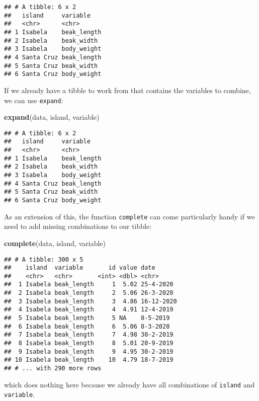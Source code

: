 \documentclass[
]{book}
\newenvironment{Shaded}{}{}
\newcommand{\KeywordTok}[1]{\textcolor[rgb]{0.00,0.44,0.13}{\textbf{#1}}}
\newcommand{\NormalTok}[1]{#1}
\begin{document}
\begin{verbatim}
## # A tibble: 6 x 2
##   island     variable   
##   <chr>      <chr>      
## 1 Isabela    beak_length
## 2 Isabela    beak_width 
## 3 Isabela    body_weight
## 4 Santa Cruz beak_length
## 5 Santa Cruz beak_width 
## 6 Santa Cruz body_weight
\end{verbatim}

If we already have a tibble to work from that contains the variables to combine, we can use \texttt{expand}:

\begin{Shaded}
\begin{Highlighting}[]
\KeywordTok{expand}\NormalTok{(data, island, variable)}
\end{Highlighting}
\end{Shaded}

\begin{verbatim}
## # A tibble: 6 x 2
##   island     variable   
##   <chr>      <chr>      
## 1 Isabela    beak_length
## 2 Isabela    beak_width 
## 3 Isabela    body_weight
## 4 Santa Cruz beak_length
## 5 Santa Cruz beak_width 
## 6 Santa Cruz body_weight
\end{verbatim}

As an extension of this, the function \texttt{complete} can come particularly handy if we need to add missing combinations to our tibble:

\begin{Shaded}
\begin{Highlighting}[]
\KeywordTok{complete}\NormalTok{(data, island, variable)}
\end{Highlighting}
\end{Shaded}

\begin{verbatim}
## # A tibble: 300 x 5
##    island  variable       id value date      
##    <chr>   <chr>       <int> <dbl> <chr>     
##  1 Isabela beak_length     1  5.02 25-4-2020 
##  2 Isabela beak_length     2  5.06 26-3-2020 
##  3 Isabela beak_length     3  4.86 16-12-2020
##  4 Isabela beak_length     4  4.91 12-4-2019 
##  5 Isabela beak_length     5 NA    8-5-2019  
##  6 Isabela beak_length     6  5.06 8-3-2020  
##  7 Isabela beak_length     7  4.98 30-2-2019 
##  8 Isabela beak_length     8  5.01 20-9-2019 
##  9 Isabela beak_length     9  4.95 30-2-2019 
## 10 Isabela beak_length    10  4.79 18-7-2019 
## # ... with 290 more rows
\end{verbatim}

which does nothing here because we already have all combinations of \texttt{island} and \texttt{variable}.
\end{document}
